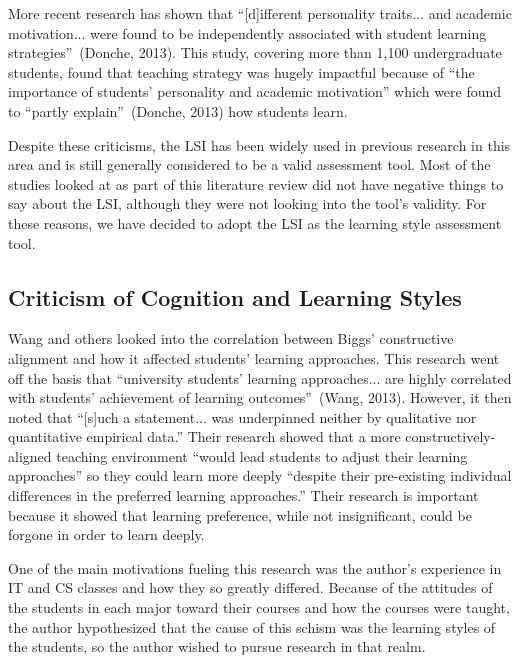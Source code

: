 More recent research has shown that ``[d]ifferent personality traits... and academic motivation... were found to be independently associated with student learning strategies''~(Donche, 2013). This study, covering more than 1,100 undergraduate students, found that teaching strategy was hugely impactful because of ``the importance of students' personality and academic motivation'' which were found to ``partly explain''~(Donche, 2013) how students learn.

Despite these criticisms, the LSI has been widely used in previous research in this area and is still generally considered to be a valid assessment tool. Most of the studies looked at as part of this literature review did not have negative things to say about the LSI, although they were not looking into the tool's validity. For these reasons, we have decided to adopt the LSI as the learning style assessment tool.

\subsection{Criticism of Cognition and Learning Styles}
Wang and others looked into the correlation between Biggs' constructive alignment and how it affected students' learning approaches. This research went off the basis that ``university students' learning approaches... are highly correlated with students' achievement of learning outcomes''~(Wang, 2013). However, it then noted that ``[s]uch a statement... was underpinned neither by qualitative nor quantitative empirical data.'' Their research showed that a more constructively-aligned teaching environment ``would lead students to adjust their learning approaches'' so they could learn more deeply ``despite their pre-existing individual differences
in the preferred learning approaches.'' Their research is important because it showed that learning preference, while not insignificant, could be forgone in order to learn deeply.

One of the main motivations fueling this research was the author's experience in IT and CS classes and how they so greatly differed. Because of the attitudes of the students in each major toward their courses and how the courses were taught, the author hypothesized that the cause of this schism was the learning styles of the students, so the author wished to pursue research in that realm.

